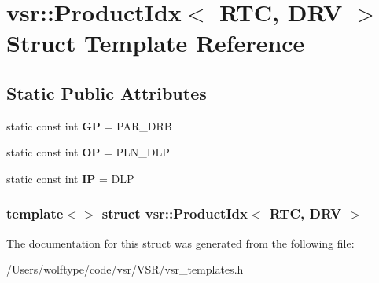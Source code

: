 \hypertarget{structvsr_1_1_product_idx_3_01_r_t_c_00_01_d_r_v_01_4}{\section{vsr\-:\-:Product\-Idx$<$ R\-T\-C, D\-R\-V $>$ Struct Template Reference}
\label{structvsr_1_1_product_idx_3_01_r_t_c_00_01_d_r_v_01_4}
}
\subsection*{Static Public Attributes}
\begin{DoxyCompactItemize}
\item 
\hypertarget{structvsr_1_1_product_idx_3_01_r_t_c_00_01_d_r_v_01_4_aab4e2bdc89a7ec312232cd10c61f196d}{static const int {\bfseries G\-P} = P\-A\-R\-\_\-\-D\-R\-B}\label{structvsr_1_1_product_idx_3_01_r_t_c_00_01_d_r_v_01_4_aab4e2bdc89a7ec312232cd10c61f196d}

\item 
\hypertarget{structvsr_1_1_product_idx_3_01_r_t_c_00_01_d_r_v_01_4_ad4f5b6992ae3428f6940f4039f5355c0}{static const int {\bfseries O\-P} = P\-L\-N\-\_\-\-D\-L\-P}\label{structvsr_1_1_product_idx_3_01_r_t_c_00_01_d_r_v_01_4_ad4f5b6992ae3428f6940f4039f5355c0}

\item 
\hypertarget{structvsr_1_1_product_idx_3_01_r_t_c_00_01_d_r_v_01_4_aa1df960f470e126e793a065936cdca8b}{static const int {\bfseries I\-P} = D\-L\-P}\label{structvsr_1_1_product_idx_3_01_r_t_c_00_01_d_r_v_01_4_aa1df960f470e126e793a065936cdca8b}

\end{DoxyCompactItemize}
\subsubsection*{template$<$$>$ struct vsr\-::\-Product\-Idx$<$ R\-T\-C, D\-R\-V $>$}



The documentation for this struct was generated from the following file\-:\begin{DoxyCompactItemize}
\item 
/\-Users/wolftype/code/vsr/\-V\-S\-R/vsr\-\_\-templates.\-h\end{DoxyCompactItemize}
